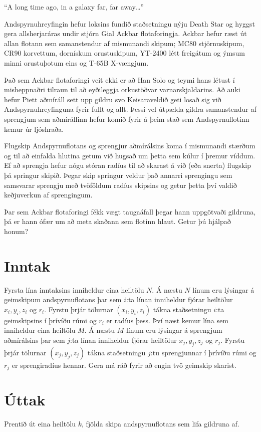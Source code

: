 ``A long time ago, in a galaxy far, far away\ldots''

Andspyrnuhreyfingin hefur loksins fundið staðsetningu nýju Death Star og hyggst
gera allsherjaráras undir stjórn Gial Ackbar flotaforingja. Ackbar hefur ræst
út allan flotann sem samanstendur af mismunandi skipum; MC80 stjörnuskipum,
CR90 korvettum, dornískum orustuskipum, YT-2400 létt freigátum og ýmsum minni
orustuþotum eins og T-65B X-vængjum.

Það sem Ackbar flotaforingi veit ekki er að Han Solo og teymi hans létust í
misheppnaðri tilraun til að eyðileggja orkustöðvar varnarskjaldarins. Að auki
hefur Piett aðmíráll sett upp gildru svo Keisaraveldið geti losað sig við
Andspyrnuhreyfinguna fyrir fullt og allt. Þessi vel útpælda gildra samanstendur
af sprengjum sem aðmírállinn hefur komið fyrir á þeim stað sem Andspyrnuflotinn
kemur úr ljóshraða.

Flugskip Andspyrnuflotans og sprengjur aðmírálsins koma í mismunandi stærðum og
til að einfalda hlutina getum við hugsað um þetta sem kúlur í þremur víddum. Ef
að sprengja hefur nógu stóran radíus til að skarast á við (eða snerta) flugskip
þá springur skipið. Þegar skip springur veldur það annarri sprengingu sem
samsvarar sprengju með tvöföldum radíus skipsins og getur þetta því valdið
keðjuverkun af sprengingum.

Þar sem Ackbar flotaforingi fékk vægt taugaáfall þegar hann uppgötvaði
gildruna, þá er hann ófær um að meta skaðann sem flotinn hlaut. Getur þú
hjálpað honum?


\section*{Inntak}
  Fyrsta lína inntaksins inniheldur eina heiltölu $N$. Á næstu $N$ línum eru
  lýsingar á geimskipum andspyrnuflotans þar sem $i$:ta línan inniheldur fjórar
  heiltölur $x_i,y_i,z_i$ og $r_i$. Fyrstu þrjár tölurnar $(x_i,y_i,z_i)$ tákna
  staðsetningu $i$:ta geimskipsins í þrívíðu rúmi og $r_i$ er radíus þess. Því
  næst kemur lína sem inniheldur eina heiltölu $M$. Á næstu $M$ línum eru
  lýsingar á sprengjum aðmírálsins þar sem $j$:ta línan inniheldur fjórar
  heiltölur $x_j,y_j,z_j$ og $r_j$. Fyrstu þrjár tölurnar $(x_j,y_j,z_j)$ tákna
  staðsetningu $j$:tu sprengjunnar í þrívíðu rúmi og $r_j$ er sprengiradíus hennar. Gera
  má ráð fyrir að engin tvö geimskip skarist.

\section*{Úttak}
  Prentið út eina heiltölu $k$, fjölda skipa andspyrnuflotans sem lifa gildruna af.

